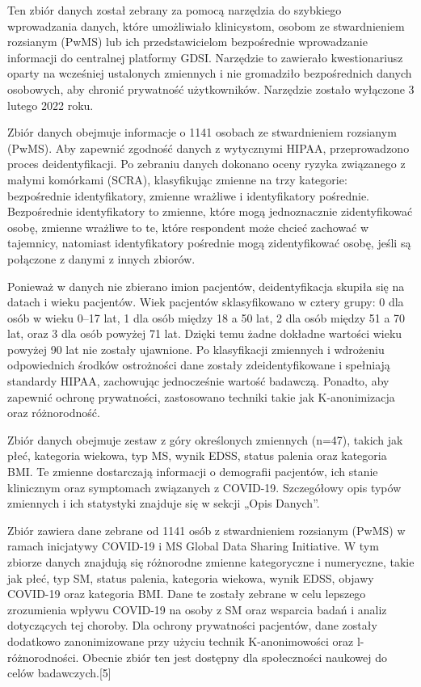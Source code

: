 \documentclass[a4paper,fleqn]{cas-dc}
\begin{document}
Ten zbiór danych został zebrany za pomocą narzędzia do szybkiego wprowadzania danych, które umożliwiało klinicystom, osobom ze stwardnieniem rozsianym (PwMS) lub ich przedstawicielom bezpośrednie wprowadzanie informacji do centralnej platformy GDSI. Narzędzie to zawierało kwestionariusz oparty na wcześniej ustalonych zmiennych i nie gromadziło bezpośrednich danych osobowych, aby chronić prywatność użytkowników. Narzędzie zostało wyłączone 3 lutego 2022 roku.

Zbiór danych obejmuje informacje o 1141 osobach ze stwardnieniem rozsianym (PwMS). Aby zapewnić zgodność danych z wytycznymi HIPAA, przeprowadzono proces deidentyfikacji. Po zebraniu danych dokonano oceny ryzyka związanego z małymi komórkami (SCRA), klasyfikując zmienne na trzy kategorie: bezpośrednie identyfikatory, zmienne wrażliwe i identyfikatory pośrednie. Bezpośrednie identyfikatory to zmienne, które mogą jednoznacznie zidentyfikować osobę, zmienne wrażliwe to te, które respondent może chcieć zachować w tajemnicy, natomiast identyfikatory pośrednie mogą zidentyfikować osobę, jeśli są połączone z danymi z innych zbiorów.

Ponieważ w danych nie zbierano imion pacjentów, deidentyfikacja skupiła się na datach i wieku pacjentów. Wiek pacjentów sklasyfikowano w cztery grupy: 0 dla osób w wieku 0–17 lat, 1 dla osób między 18 a 50 lat, 2 dla osób między 51 a 70 lat, oraz 3 dla osób powyżej 71 lat. Dzięki temu żadne dokładne wartości wieku powyżej 90 lat nie zostały ujawnione. Po klasyfikacji zmiennych i wdrożeniu odpowiednich środków ostrożności dane zostały zdeidentyfikowane i spełniają standardy HIPAA, zachowując jednocześnie wartość badawczą. Ponadto, aby zapewnić ochronę prywatności, zastosowano techniki takie jak K-anonimizacja oraz różnorodność.

Zbiór danych obejmuje zestaw z góry określonych zmiennych (n=47), takich jak płeć, kategoria wiekowa, typ MS, wynik EDSS, status palenia oraz kategoria BMI. Te zmienne dostarczają informacji o demografii pacjentów, ich stanie klinicznym oraz symptomach związanych z COVID-19. Szczegółowy opis typów zmiennych i ich statystyki znajduje się w sekcji „Opis Danych”.

Zbiór zawiera dane zebrane od 1141 osób z stwardnieniem rozsianym (PwMS) w ramach inicjatywy COVID-19 i MS Global Data Sharing Initiative. W tym zbiorze danych znajdują się różnorodne zmienne kategoryczne i numeryczne, takie jak płeć, typ SM, status palenia, kategoria wiekowa, wynik EDSS, objawy COVID-19 oraz kategoria BMI. Dane te zostały zebrane w celu lepszego zrozumienia wpływu COVID-19 na osoby z SM oraz wsparcia badań i analiz dotyczących tej choroby. Dla ochrony prywatności pacjentów, dane zostały dodatkowo zanonimizowane przy użyciu technik K-anonimowości oraz l-różnorodności. Obecnie zbiór ten jest dostępny dla społeczności naukowej do celów badawczych.[5]
\end{document}
